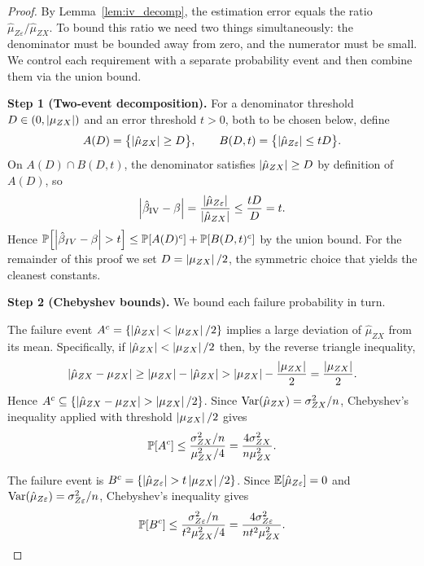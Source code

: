 \begin{proof}
    By Lemma~\ref{lem:iv_decomp}, the estimation error equals the ratio $\hat{\mu}_{Z\varepsilon}/\hat{\mu}_{ZX}$. To bound this ratio we need two things simultaneously: the denominator must be bounded away from zero, and the numerator must be small. We control each requirement with a separate probability event and then combine them via the union bound.

    \medskip\noindent\textbf{Step 1 (Two-event decomposition).}
    For a denominator threshold $D \in (0,\left|\mu_{ZX}\right|)$ and an error threshold $t > 0$, both to be chosen below, define
    \[
        A(D)   = \bigl\{\left|\hat{\mu}_{ZX}\right| \geq D\bigr\},
        \qquad
        B(D,t) = \bigl\{\left|\hat{\mu}_{Z\varepsilon}\right| \leq tD\bigr\}.
    \]
    On $A(D)\cap B(D,t)$, the denominator satisfies $\left|\hat{\mu}_{ZX}\right|\geq D$ by definition of $A(D)$, so
    \[
        \left|\hat{\beta}_{\mathrm{IV}} - \beta\right|= \frac{\left|\hat{\mu}_{Z \varepsilon}\right|}{\left|\hat{\mu}_{ZX}\right|} \leq \frac{tD}{D} = t.
    \]
    Hence $\Prob\!\left[\abs{\hat\beta_{IV}-\beta}>t\right] \leq \Prob[A(D)^c] + \Prob[B(D,t)^c]$ by the union bound. For the remainder of this proof we set $D = \left|\mu_{ZX}\right|/2$, the symmetric choice that yields the cleanest constants.

    \medskip\noindent\textbf{Step 2 (Chebyshev bounds).}
    We bound each failure probability in turn.

    The failure event $A^c = \{\left|\hat{\mu}_{ZX}\right| < \left|\mu_{ZX}\right|/2\}$ implies a large deviation of $\hat{\mu}_{ZX}$ from its mean. Specifically, if $\left|\hat{\mu}_{ZX}\right| < \left|\mu_{ZX}\right|/2$ then, by the reverse triangle inequality,
    \[
        \left|\hat{\mu}_{ZX} - \mu_{ZX}\right| \geq \left|\mu_{ZX}\right| - \left|\hat{\mu}_{ZX}\right| > \left|\mu_{ZX}\right| - \frac{\left|\mu_{ZX}\right|}{2} = \frac{\left|\mu_{ZX}\right|}{2}.
    \]
    Hence $A^c \subseteq \{\left|\hat{\mu}_{ZX}-\mu_{ZX}\right| > \left|\mu_{ZX}\right|/2\}$. Since $\operatorname{Var}(\hat{\mu}_{ZX}) = \sigma_{ZX}^2/n$, Chebyshev's inequality applied with threshold $\left|\mu_{ZX}\right|/2$ gives
    \[
        \operatorname{\mathbb{P}}[A^c] \leq \frac{\sigma_{ZX}^2/n}{\mu_{ZX}^2/4} = \frac{4\sigma_{ZX}^2}{n\mu_{ZX}^2}.
    \]

    The failure event is $B^c = \{\left|\hat{\mu}_{Z\varepsilon}\right| > t\left|\mu_{ZX}\right|/2\}$. Since $\operatorname{\mathbb{E}}[\hat{\mu}_{Z\varepsilon}] = 0$ and $\operatorname{Var}(\hat{\mu}_{Z\varepsilon}) = \sigma_{Z\varepsilon}^2/n$, Chebyshev's inequality gives
    \[
        \operatorname{\mathbb{P}}[B^c] \leq \frac{\sigma_{Z\varepsilon}^2/n}{t^2\mu_{ZX}^2/4} = \frac{4\sigma_{Z\varepsilon}^2}{nt^2\mu_{ZX}^2}.
    \]


\end{proof}
